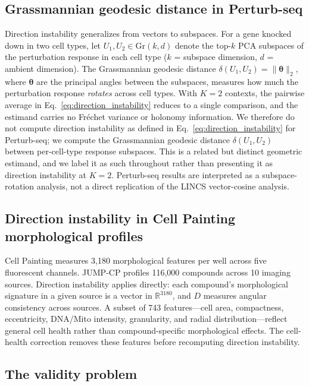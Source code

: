 \documentclass[11pt]{article}
\begin{document}
\subsection{Grassmannian geodesic distance in Perturb-seq}

Direction instability generalizes from vectors to subspaces. For a gene
knocked down in two cell types, let $U_1, U_2 \in \text{Gr}(k, d)$ denote
the top-$k$ PCA subspaces of the perturbation response in each cell type
($k$ = subspace dimension, $d$ = ambient dimension).
The Grassmannian geodesic distance $\delta(U_1, U_2) =
\|\boldsymbol{\theta}\|_2$, where $\boldsymbol{\theta}$ are the principal
angles between the subspaces, measures how much the perturbation response
\emph{rotates} across cell types. With $K = 2$ contexts, the pairwise
average in Eq.~\ref{eq:direction_instability} reduces to a single
comparison, and the estimand carries no Fr\'{e}chet variance or holonomy
information. We therefore do not compute direction instability as defined
in Eq.~\ref{eq:direction_instability} for Perturb-seq; we compute the
Grassmannian geodesic distance $\delta(U_1, U_2)$ between per-cell-type
response subspaces. This is a related but distinct geometric estimand, and
we label it as such throughout rather than presenting it as direction
instability at $K = 2$. Perturb-seq results are interpreted as a
subspace-rotation analysis, not a direct replication of the LINCS
vector-cosine analysis.

\subsection{Direction instability in Cell Painting morphological profiles}

Cell Painting \citep{bray2016cell,chandrasekaran2023jump} measures 3{,}180 morphological
features per well across five fluorescent channels. JUMP-CP
profiles 116{,}000 compounds across 10 imaging sources. Direction
instability applies directly: each compound's morphological signature in a
given source is a vector in $\mathbb{R}^{3180}$, and $D$ measures angular
consistency across sources. A subset of 743 features---cell area, compactness,
eccentricity, DNA/Mito intensity, granularity, and radial
distribution---reflect general cell health rather than compound-specific
morphological effects. The cell-health correction removes these features
before recomputing direction instability.

\subsection{The validity problem}
\end{document}
